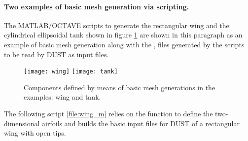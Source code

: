 \paragraph{Two examples of basic mesh generation via scripting.}
The MATLAB/OCTAVE scripts to generate the rectangular wing and the cylindrical ellipsoidal tank shown in figure \ref{fig:basic_components_example} are shown in this paragraph as an example of basic mesh generation along with the ,  files generated by the scripts to be read by DUST as input files.
\newline
\begin{figure}[h]
\centering
\texttt{[image: wing]} \hspace{30pt}
\texttt{[image: tank]}
\caption{Components defined by means of basic mesh generations in the examples: wing and tank.}
\label{fig:basic_components_example}
\end{figure}
\newline
The following script \ref{file:wing_m} relies on the function  to define the two-dimensional airfoils and builds the basic input files for DUST of a rectangular wing with open tips.
